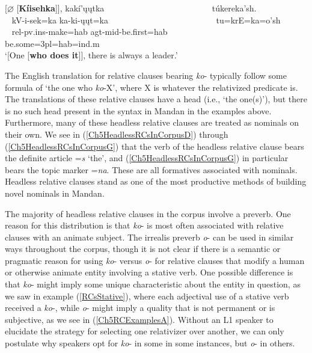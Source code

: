 \begin{exe}
\begin{xlist}
        \item\label{Ch5HeadlessRCsInCorpusH} \glll \textnormal{[}$\varnothing$ \textnormal{[}\textbf{Kíisehka}\textnormal{]]}, kakí'ųųtka ~ ~ ~ ~ ~ ~ ~ ~ ~ ~ ~ ~ ~ ~ ~ túkereka'sh.\\
        ~ kV-i-sek=ka ka-ki-ųųt=ka ~ ~ ~ ~ ~ ~ ~ ~ ~ ~ ~ ~ ~ ~ ~ tu=krE=ka=o'sh\\
        ~ rel-pv.ins-\textnormal{make}=hab agt-mid-\textnormal{be.first}=hab ~ ~ ~ ~ ~ ~ ~ ~ ~ ~ ~ ~ ~ ~ ~ \textnormal{be.some}=3pl=hab=ind.m\\
        \glt `[One [\textbf{who does it}]], there is always a leader.' \citep[238]{trechter2012b}
    \end{xlist}
\end{exe}

The English translation for relative clauses bearing \textit{ko}- typically follow some formula of `the one who \textit{ko}-X', where X is whatever the relativized predicate is. The translations of these relative clauses have a head (i.e., `the one(s)'), but there is no such head present in the syntax in Mandan in the examples above. Furthermore, many of these headless relative clauses are treated as nominals on their own. We see in (\ref{Ch5HeadlessRCsInCorpusD}) through (\ref{Ch5HeadlessRCsInCorpusG}) that the verb of the headless relative clause bears the definite article =\textit{s} `the', and (\ref{Ch5HeadlessRCsInCorpusG}) in particular bears the topic marker =\textit{na}. These are all formatives associated with nominals. Headless relative clauses stand as one of the most productive methods of building novel nominals in Mandan.

The majority of headless relative clauses in the corpus involve a preverb. One reason for this distribution is that \textit{ko}- is most often associated with relative clauses with an animate subject. The irrealis preverb \textit{o}- can be used in similar ways throughout the corpus, though it is not clear if there is a semantic or pragmatic reason for using \textit{ko}- versus \textit{o}- for relative clauses that modify a human or otherwise animate entity involving a stative verb. One possible difference is that \textit{ko}- might imply some unique characteristic about the entity in question, as we saw in example (\ref{RCsStative}), where each adjectival use of a stative verb received a \textit{ko}-, while \textit{o}- might imply a quality that is not permanent or is subjective, as we see in (\ref{Ch5RCExamplesA}). Without an L1 speaker to elucidate the strategy for selecting one relativizer over another, we can only postulate why speakers opt for \textit{ko}- in some in some instances, but \textit{o}- in others.
